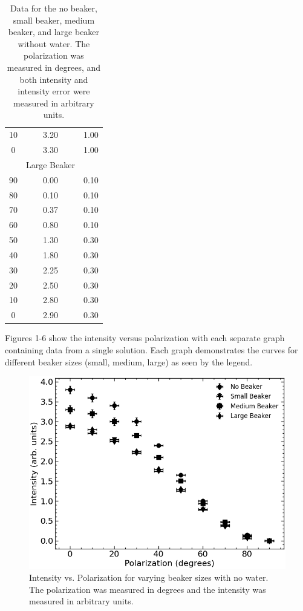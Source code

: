 \begin{table}[H]
\begin{center}
{\begin{tabular}{ccc}
			10 & 3.20 & 1.00 \\
			0 & 3.30 & 1.00 \\
			\hline
			& Large Beaker & \\
			\hline
			90 & 0.00 & 0.10 \\
			80 & 0.10 & 0.10 \\
			70 & 0.37 & 0.10 \\
			60 & 0.80 & 0.10 \\
			50 & 1.30 & 0.30 \\
			40 & 1.80 & 0.30 \\
			30 & 2.25 & 0.30 \\
			20 & 2.50 & 0.30 \\
			10 & 2.80 & 0.30 \\
			0 & 2.90 & 0.30 \\
			\bottomrule
		\end{tabular}}
	\end{center}
	\caption{Data for the no beaker, small beaker, medium beaker, and large beaker without water. The polarization was measured in degrees, and both intensity and intensity error were measured in arbitrary units.}
	\label{tab:no_water}
\end{table}

Figures 1-6 show the intensity versus polarization with each separate graph containing data from a single solution. Each graph demonstrates the curves for different beaker sizes (small, medium, large) as seen by the legend.

\begin{figure}[H]
    \begin{center}
        \includegraphics[width=\columnwidth]{../figures/no_water.png}
    \end{center}
    \caption{Intensity vs. Polarization for varying beaker sizes with no water. The polarization was measured in degrees and the intensity was measured in arbitrary units.}
    \label{fig:no_water}
\end{figure}

